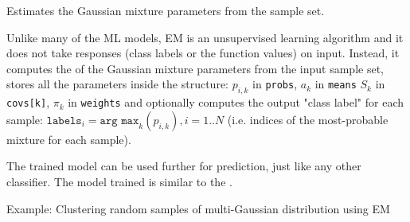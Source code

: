 
Estimates the Gaussian mixture parameters from the sample set.


Unlike many of the ML models, EM is an unsupervised learning algorithm and it does not take responses (class labels or the function values) on input. Instead, it computes the  of the Gaussian mixture parameters from the input sample set, stores all the parameters inside the structure: $p_{i,k}$ in \texttt{probs}, $a_k$ in \texttt{means} $S_k$ in \texttt{covs[k]}, $\pi_k$ in \texttt{weights} and optionally computes the output "class label" for each sample: $\texttt{labels}_i=\texttt{arg max}_k(p_{i,k}), i=1..N$ (i.e. indices of the most-probable mixture for each sample).

The trained model can be used further for prediction, just like any other classifier. The model trained is similar to the .


Example: Clustering random samples of multi-Gaussian distribution using EM


